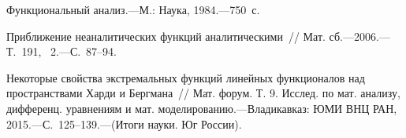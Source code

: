  \Endproc


 \beginproof
 \endproof


 \Endproc


 \Sledstvie{}
 \Endproc

 \Zam{}

 \Primer{}






\Lit

 \begin{enumerate}
 {\footnotesize
 \itemsep=0pt
 \parskip=0pt


 {Функциональный анализ.---М.: Наука,  1984.---750~с.} %

 {Приближение неаналитических функций аналитическими~/\!/ Мат. сб.---2006.---Т.~191, \No~2.---С.~87--94.}%


 {Некоторые свойства экстремальных функций линейных функционалов над пространствами Харди и Бергмана~/\!/
 Мат. форум. Т. 9. Исслед. по мат. анализу, дифференц. уравнениям и мат.
 моделированию.---Владикавказ: ЮМИ ВНЦ РАН, 2015.---С.~125--139.---(Итоги науки. Юг России).} %

 }
 \end{enumerate}







